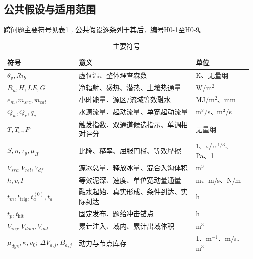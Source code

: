 \subsection{公共假设与适用范围}
跨问题主要符号见表\ref{tab:symbols}；公共假设逐条列于其后，编号H0-1至H0-9。

\begin{table}[htbp]\centering\footnotesize
\caption{主要符号}\label{tab:symbols}
\begin{tabular}{@{}l l l@{}}\toprule
符号&意义&单位\\\midrule
$\theta_v,Ri_b$&虚位温、整体理查森数&K、无量纲\\
$R_n,H,LE,G$&净辐射、感热、潜热、土壤热通量&W/m$^2$\\
$e_m,m_{src},m_{cat}$&小时能量、源区/流域等效融水&MJ/m$^2$、mm\\
$Q_w,Q_c,q_c$&水源流量、起动流量、单宽起动流量&m$^3$/s、m$^2$/s\\
$T,T_w,P$&触发指数、双通道候选指示、单调相对评分&无量纲\\
$S,n,\tau_y,\mu_H$&比降、糙率、屈服门槛、等效摩擦&1、s/m$^{1/3}$、Pa、1\\
$V_{src},V_{rel},V_{df}$&源冰总量、释放冰量、混合入沟体积&m$^3$\\
$h,v,I$&等效泥深、速度、单位宽动量通量&m、m/s、N/m\\
$t_m,t_{\mathrm{trig}},t_a^{(0)},t_a$&融水起始、真实形成、条件到达、实际到达&h\\
$t_p,t_{\mathrm{hit}}$&固定发布、题给冲击锚点&h\\
$V_{inj},V_{dom},V_{out}$&累计注入、域内、累计出域体积&m$^3$\\
$\mu_{dyn},\kappa,v_0;\ \Delta V_{a,j},B_{a,j}$&动力与节点库存&1、m$^{-1}$、m/s、m$^3$\\\bottomrule
\end{tabular}\end{table}

